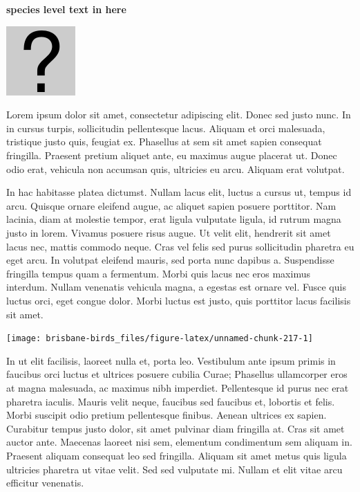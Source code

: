\documentclass[]{book}
\let\origfigure\figure
\let\endorigfigure\endfigure
\renewenvironment{figure}[1][2] {
  \expandafter\origfigure\expandafter[H]
} {
  \endorigfigure
}
\begin{document}
\textbf{species level text in here}

\begin{figure}
\centering
\includegraphics{assets/missing.png}
\caption{No image for species}
\end{figure}

Lorem ipsum dolor sit amet, consectetur adipiscing elit. Donec sed justo
nunc. In in cursus turpis, sollicitudin pellentesque lacus. Aliquam et
orci malesuada, tristique justo quis, feugiat ex. Phasellus at sem sit
amet sapien consequat fringilla. Praesent pretium aliquet ante, eu
maximus augue placerat ut. Donec odio erat, vehicula non accumsan quis,
ultricies eu arcu. Aliquam erat volutpat.

In hac habitasse platea dictumst. Nullam lacus elit, luctus a cursus ut,
tempus id arcu. Quisque ornare eleifend augue, ac aliquet sapien posuere
porttitor. Nam lacinia, diam at molestie tempor, erat ligula vulputate
ligula, id rutrum magna justo in lorem. Vivamus posuere risus augue. Ut
velit elit, hendrerit sit amet lacus nec, mattis commodo neque. Cras vel
felis sed purus sollicitudin pharetra eu eget arcu. In volutpat eleifend
mauris, sed porta nunc dapibus a. Suspendisse fringilla tempus quam a
fermentum. Morbi quis lacus nec eros maximus interdum. Nullam venenatis
vehicula magna, a egestas est ornare vel. Fusce quis luctus orci, eget
congue dolor. Morbi luctus est justo, quis porttitor lacus facilisis sit
amet.

\begin{figure}
\texttt{[image: brisbane-birds\_files/figure-latex/unnamed-chunk-217-1]} \caption{insert figure caption}\label{fig:unnamed-chunk-217}
\end{figure}

In ut elit facilisis, laoreet nulla et, porta leo. Vestibulum ante ipsum
primis in faucibus orci luctus et ultrices posuere cubilia Curae;
Phasellus ullamcorper eros at magna malesuada, ac maximus nibh
imperdiet. Pellentesque id purus nec erat pharetra iaculis. Mauris velit
neque, faucibus sed faucibus et, lobortis et felis. Morbi suscipit odio
pretium pellentesque finibus. Aenean ultrices ex sapien. Curabitur
tempus justo dolor, sit amet pulvinar diam fringilla at. Cras sit amet
auctor ante. Maecenas laoreet nisi sem, elementum condimentum sem
aliquam in. Praesent aliquam consequat leo sed fringilla. Aliquam sit
amet metus quis ligula ultricies pharetra ut vitae velit. Sed sed
vulputate mi. Nullam et elit vitae arcu efficitur venenatis.
\end{document}
